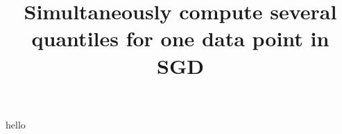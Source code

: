 \documentclass[12pt]{article}
\title{Simultaneously compute several quantiles for one data point in SGD}
\date{\vspace{-5ex}}
\begin{document}
\maketitle
hello
\end{document}
